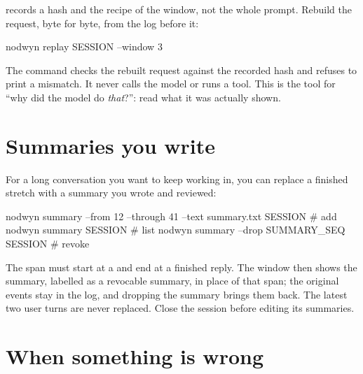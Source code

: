  records a hash and the recipe of the window, not the whole
prompt. Rebuild the request, byte for byte, from the log before it:

\begin{sh}
nodwyn replay SESSION --window 3
\end{sh}

\begin{txt}
{
  "Model": "demo",
  "Messages": [
    {
      "role": "system",
      "content": "You are nodwyn, a coding agent working inside the repository at ...
\end{txt}

The command checks the rebuilt request against the recorded hash and
refuses to print a mismatch. It never calls the model or runs a tool. This
is the tool for ``why did the model do \emph{that}?'': read what it was
actually shown.

\section{Summaries you write}

For a long conversation you want to keep working in, you can replace a
finished stretch with a summary you wrote and reviewed:

\begin{sh}
nodwyn summary --from 12 --through 41 --text summary.txt SESSION   # add
nodwyn summary SESSION                                              # list
nodwyn summary --drop SUMMARY_SEQ SESSION                           # revoke
\end{sh}

The span must start at a  and end at a finished reply. The
window then shows the summary, labelled as a revocable summary, in place of
that span; the original events stay in the log, and dropping the summary
brings them back. The latest two user turns are never replaced. Close the
session before editing its summaries.

\section{When something is wrong}

